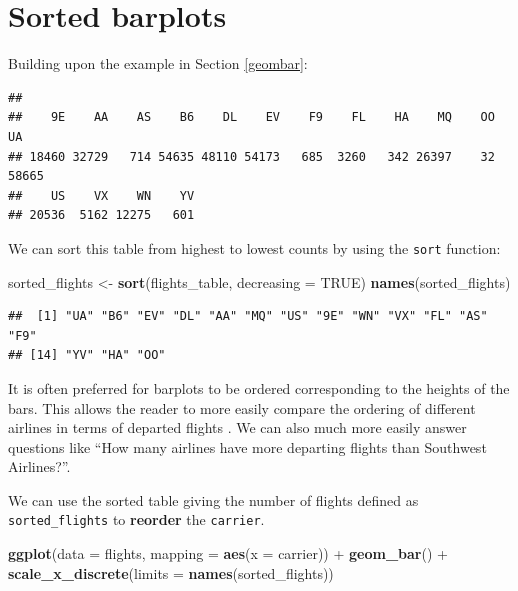 \documentclass[]{tufte-book}
\newenvironment{Shaded}{\begin{snugshade}}{\end{snugshade}}
\newcommand{\KeywordTok}[1]{\textcolor[rgb]{0.13,0.29,0.53}{\textbf{{#1}}}}
\newcommand{\DataTypeTok}[1]{\textcolor[rgb]{0.13,0.29,0.53}{{#1}}}
\newcommand{\StringTok}[1]{\textcolor[rgb]{0.31,0.60,0.02}{{#1}}}
\newcommand{\OtherTok}[1]{\textcolor[rgb]{0.56,0.35,0.01}{{#1}}}
\newcommand{\NormalTok}[1]{{#1}}
\theoremstyle{definition}
\theoremstyle{definition}
\theoremstyle{remark}
\begin{document}
\section{Sorted barplots}\label{sorted-barplots}

Building upon the example in Section \ref{geombar}:

\begin{Shaded}
\end{Shaded}

\begin{verbatim}
## 
##    9E    AA    AS    B6    DL    EV    F9    FL    HA    MQ    OO    UA 
## 18460 32729   714 54635 48110 54173   685  3260   342 26397    32 58665 
##    US    VX    WN    YV 
## 20536  5162 12275   601
\end{verbatim}

We can sort this table from highest to lowest counts by using the
\texttt{sort} function:

\begin{Shaded}
\begin{Highlighting}[]
\NormalTok{sorted_flights <-}\StringTok{ }\KeywordTok{sort}\NormalTok{(flights_table, }\DataTypeTok{decreasing =} \OtherTok{TRUE}\NormalTok{)}
\KeywordTok{names}\NormalTok{(sorted_flights)}
\end{Highlighting}
\end{Shaded}

\begin{verbatim}
##  [1] "UA" "B6" "EV" "DL" "AA" "MQ" "US" "9E" "WN" "VX" "FL" "AS" "F9"
## [14] "YV" "HA" "OO"
\end{verbatim}

It is often preferred for barplots to be ordered corresponding to the
heights of the bars. This allows the reader to more easily compare the
ordering of different airlines in terms of departed flights
\citep{robbins2013}. We can also much more easily answer questions like
``How many airlines have more departing flights than Southwest
Airlines?''.

We can use the sorted table giving the number of flights defined as
\texttt{sorted\_flights} to \textbf{reorder} the \texttt{carrier}.

\begin{Shaded}
\begin{Highlighting}[]
\KeywordTok{ggplot}\NormalTok{(}\DataTypeTok{data =} \NormalTok{flights, }\DataTypeTok{mapping =} \KeywordTok{aes}\NormalTok{(}\DataTypeTok{x =} \NormalTok{carrier)) +}
\StringTok{  }\KeywordTok{geom_bar}\NormalTok{() +}
\StringTok{  }\KeywordTok{scale_x_discrete}\NormalTok{(}\DataTypeTok{limits =} \KeywordTok{names}\NormalTok{(sorted_flights))}
\end{Highlighting}
\end{Shaded}
\end{document}

